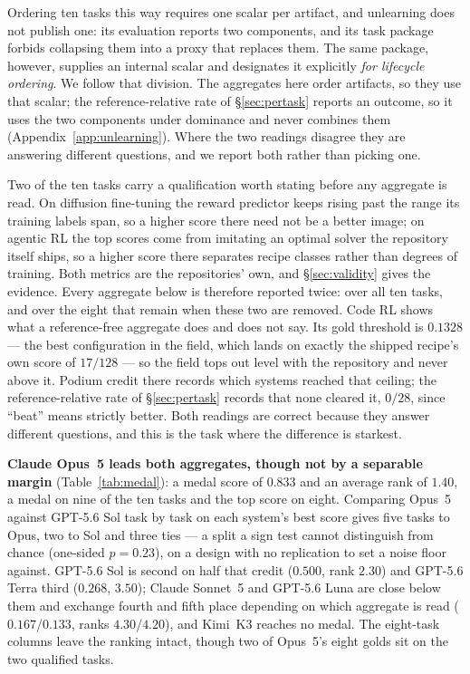 Ordering ten tasks this way requires one scalar per artifact, and unlearning does not publish one:
its evaluation reports two components, and its task package forbids collapsing them into a proxy that
replaces them. The same package, however, supplies an internal scalar and designates it explicitly
\emph{for lifecycle ordering}. We follow that division. The aggregates here order artifacts, so they
use that scalar; the reference-relative rate of \S\ref{sec:pertask} reports an outcome, so it uses the
two components under dominance and never combines them (Appendix~\ref{app:unlearning}). Where the two
readings disagree they are answering different questions, and we report both rather than picking one.

Two of the ten tasks carry a qualification worth stating before any aggregate is read. On diffusion
fine-tuning the reward predictor keeps rising past the range its training labels span, so a higher
score there need not be a better image; on agentic RL the top scores come from imitating an optimal
solver the repository itself ships, so a higher score there separates recipe classes rather than
degrees of training. Both metrics are the repositories' own, and \S\ref{sec:validity} gives the
evidence. Every aggregate below is therefore reported twice: over all ten tasks, and over the eight
that remain when these two are removed. Code RL shows what a reference-free aggregate does and does not say. Its
gold threshold is $0.1328$ --- the best configuration in the field, which lands on exactly the shipped
recipe's own score of $17/128$ --- so the field tops out level with the repository and never above it.
Podium credit there records which systems reached that ceiling; the reference-relative rate of
\S\ref{sec:pertask} records that none cleared it, $0/28$, since ``beat'' means strictly better. Both
readings are correct because they answer different questions, and this is the task where the
difference is starkest.

\textbf{Claude Opus~5 leads both aggregates, though not by a separable margin}
(Table~\ref{tab:medal}): a medal score of $0.833$ and an average rank of $1.40$, a medal on nine of the
ten tasks and the top score on eight. Comparing Opus~5 against GPT-5.6 Sol task by task on each
system's best score gives five tasks to Opus, two to Sol and three ties --- a split a sign test cannot
distinguish from chance (one-sided $p=0.23$), on a design with no replication to set a noise floor
against. GPT-5.6 Sol is second on half that credit ($0.500$, rank $2.30$) and GPT-5.6 Terra third
($0.268$, $3.50$); Claude Sonnet~5 and GPT-5.6 Luna are close below them and exchange fourth and fifth
place depending on which aggregate is read ($0.167$/$0.133$, ranks $4.30$/$4.20$), and Kimi~K3 reaches
no medal. The eight-task columns leave the ranking intact, though two of Opus~5's eight golds sit on
the two qualified tasks.

